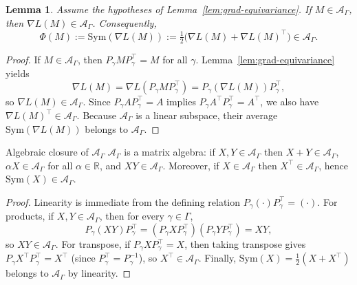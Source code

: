 \documentclass{article}
\theoremstyle{plain}
\newtheorem{lemma}{Lemma}[section]
\numberwithin{equation}{section}
\theoremstyle{definition}
\theoremstyle{remark}
\begin{document}
\begin{lemmaproofbox}
\begin{lemma}
Assume the hypotheses of Lemma~\ref{lem:grad-equivariance}.
If $M\in\mathcal{A}_\Gamma$, then $\nabla L(M)\in\mathcal{A}_\Gamma$.
Consequently,
\[
\Phi(M):=\mathrm{Sym}(\nabla L(M)):=\tfrac12\big(\nabla L(M)+\nabla L(M)^\top\big)
\in\mathcal{A}_\Gamma.
\]
\end{lemma}
\begin{proof}
If $M\in\mathcal{A}_\Gamma$, then $P_\gamma M P_\gamma^\top=M$ for all $\gamma$.
Lemma~\ref{lem:grad-equivariance} yields
\[
\nabla L(M)=\nabla L(P_\gamma M P_\gamma^\top)=P_\gamma(\nabla L(M))P_\gamma^\top,
\]
so $\nabla L(M)\in\mathcal{A}_\Gamma$.
Since $P_\gamma A P_\gamma^\top=A$ implies $P_\gamma A^\top P_\gamma^\top=A^\top$,
we also have $\nabla L(M)^\top\in\mathcal{A}_\Gamma$.
Because $\mathcal{A}_\Gamma$ is a linear subspace, their average $\mathrm{Sym}(\nabla L(M))$ belongs to $\mathcal{A}_\Gamma$.
\end{proof}
\end{lemmaproofbox}

\begin{lemmaproofbox}{Algebraic closure of $\mathcal{A}_\Gamma$}\label{lem:commutant-algebra}
$\mathcal{A}_\Gamma$ is a matrix algebra: if $X,Y\in\mathcal{A}_\Gamma$ then
$X+Y\in\mathcal{A}_\Gamma$, $\alpha X\in\mathcal{A}_\Gamma$ for all $\alpha\in\mathbb{R}$,
and $XY\in\mathcal{A}_\Gamma$.
Moreover, if $X\in\mathcal{A}_\Gamma$ then $X^\top\in\mathcal{A}_\Gamma$, hence $\mathrm{Sym}(X)\in\mathcal{A}_\Gamma$.
\tcblower
\begin{proof}
Linearity is immediate from the defining relation $P_\gamma(\cdot)P_\gamma^\top=(\cdot)$.
For products, if $X,Y\in\mathcal{A}_\Gamma$, then for every $\gamma\in\Gamma$,
\[
P_\gamma(XY)P_\gamma^\top=(P_\gamma X P_\gamma^\top)(P_\gamma Y P_\gamma^\top)=XY,
\]
so $XY\in\mathcal{A}_\Gamma$.
For transpose, if $P_\gamma X P_\gamma^\top=X$, then taking transpose gives
$P_\gamma X^\top P_\gamma^\top=X^\top$ (since $P_\gamma^\top=P_\gamma^{-1}$), so $X^\top\in\mathcal{A}_\Gamma$.
Finally, $\mathrm{Sym}(X)=\tfrac12(X+X^\top)$ belongs to $\mathcal{A}_\Gamma$ by linearity.
\end{proof}
\end{lemmaproofbox}
\end{document}
